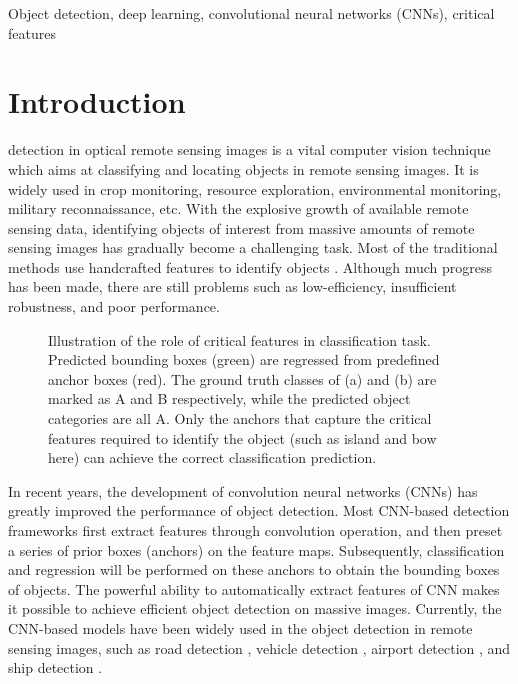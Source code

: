 \documentclass[journal]{IEEEtran}
\begin{document}
\begin{IEEEkeywords}
Object detection, deep learning, convolutional neural networks (CNNs), critical features
\end{IEEEkeywords}






\IEEEpeerreviewmaketitle



\section{Introduction}
  detection in optical remote sensing images is a vital computer vision technique which aims at classifying and locating objects in remote sensing images. It is widely used in crop monitoring, resource exploration, environmental monitoring, military reconnaissance, etc. With the explosive growth of available remote sensing data, identifying objects of interest from massive amounts of remote sensing images has gradually become a challenging task. Most of the traditional methods use handcrafted features to identify objects \cite{li2012automatic, han2014efficient, han2014object, zhu2010novel, eikvil2009classification}. Although much progress has been made, there are still problems such as low-efficiency, insufficient robustness, and poor performance.

\begin{figure}[t]
	\centering
	\hspace{1mm}
	\caption{Illustration of the role of critical features in classification task. Predicted bounding boxes  (green) are regressed from predefined anchor boxes (red). The ground truth classes of (a) and (b) are marked as A and B respectively, while the predicted object categories are all A. Only the anchors that capture the critical features required to identify the object (such as island and bow here) can achieve the correct classification prediction.}
	\label{Fig1}
\end{figure} 

In recent years, the development of convolution neural networks (CNNs) has greatly improved the performance of object detection. Most CNN-based detection frameworks first extract features through convolution operation, and then preset a series of prior boxes (anchors) on the feature maps. Subsequently, classification and regression will be performed on these anchors to obtain the bounding boxes of objects. The powerful ability to automatically extract features of CNN makes it possible to achieve efficient object detection on massive images. Currently, the CNN-based models have been widely used in the object detection in remote sensing images, such as road detection \cite{yang2019road}, vehicle detection \cite{ji2019vehicle}, airport detection \cite{liu2019multi}, and ship detection \cite{wu2018inshore, li2018hsf}. 
\end{document}
